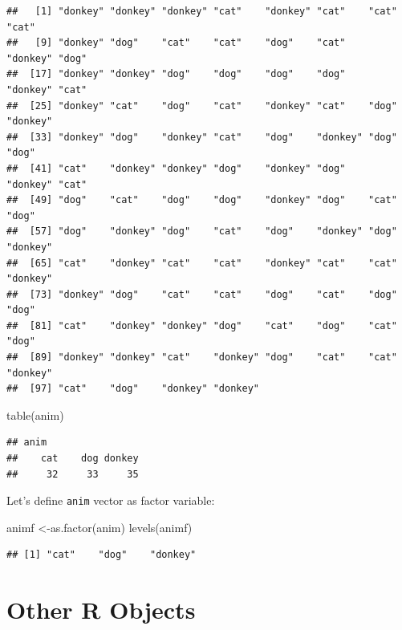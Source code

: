 \documentclass[
]{book}
\newenvironment{Shaded}{\begin{snugshade}}{\end{snugshade}}
\newcommand{\FunctionTok}[1]{\textcolor[rgb]{0.00,0.00,0.00}{#1}}
\newcommand{\NormalTok}[1]{#1}
\newcommand{\OtherTok}[1]{\textcolor[rgb]{0.56,0.35,0.01}{#1}}
\begin{document}
\begin{verbatim}
##   [1] "donkey" "donkey" "donkey" "cat"    "donkey" "cat"    "cat"    "cat"   
##   [9] "donkey" "dog"    "cat"    "cat"    "dog"    "cat"    "donkey" "dog"   
##  [17] "donkey" "donkey" "dog"    "dog"    "dog"    "dog"    "donkey" "cat"   
##  [25] "donkey" "cat"    "dog"    "cat"    "donkey" "cat"    "dog"    "donkey"
##  [33] "donkey" "dog"    "donkey" "cat"    "dog"    "donkey" "dog"    "dog"   
##  [41] "cat"    "donkey" "donkey" "dog"    "donkey" "dog"    "donkey" "cat"   
##  [49] "dog"    "cat"    "dog"    "dog"    "donkey" "dog"    "cat"    "dog"   
##  [57] "dog"    "donkey" "dog"    "cat"    "dog"    "donkey" "dog"    "donkey"
##  [65] "cat"    "donkey" "cat"    "cat"    "donkey" "cat"    "cat"    "donkey"
##  [73] "donkey" "dog"    "cat"    "cat"    "dog"    "cat"    "dog"    "dog"   
##  [81] "cat"    "donkey" "donkey" "dog"    "cat"    "dog"    "cat"    "dog"   
##  [89] "donkey" "donkey" "cat"    "donkey" "dog"    "cat"    "cat"    "donkey"
##  [97] "cat"    "dog"    "donkey" "donkey"
\end{verbatim}

\begin{Shaded}
\begin{Highlighting}[]
\FunctionTok{table}\NormalTok{(anim)}
\end{Highlighting}
\end{Shaded}

\begin{verbatim}
## anim
##    cat    dog donkey 
##     32     33     35
\end{verbatim}

Let's define \texttt{anim} vector as factor variable:

\begin{Shaded}
\begin{Highlighting}[]
\NormalTok{animf }\OtherTok{\textless{}{-}}\FunctionTok{as.factor}\NormalTok{(anim)}
\FunctionTok{levels}\NormalTok{(animf)}
\end{Highlighting}
\end{Shaded}

\begin{verbatim}
## [1] "cat"    "dog"    "donkey"
\end{verbatim}

\hypertarget{other-r-objects}{%
\chapter{Other R Objects}\label{other-r-objects}}
\end{document}
